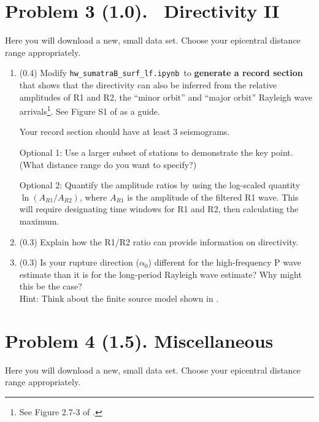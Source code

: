 \documentclass[11pt,titlepage,fleqn]{article}
\newcommand{\tfilelf}{{\tt hw\_sumatraB\_surf\_lf.ipynb}}
\begin{document}

\pagebreak
\section*{Problem 3 (1.0). \ptag\ Directivity II}

Here you will download a new, small data set.
Choose your epicentral distance range appropriately.

\begin{enumerate}
\item (0.4) Modify \tfilelf\ to \textbf{generate a record section} that shows that the directivity can also be inferred from the relative amplitudes of R1 and R2, the ``minor orbit'' and ``major orbit'' Rayleigh wave arrivals\footnote{See Figure 2.7-3 of \citet{SteinWysession}.}. See Figure S1 of \citet{Ammon2005} as a guide.

Your record section should have at least 3 seismograms.
  
Optional 1: Use a larger subset of stations to demonstrate the key point. (What distance range do you want to specify?)
  
Optional 2: Quantify the amplitude ratios by using the log-scaled quantity $\ln(A_{R1}/A_{R2})$, where $A_{R1}$ is the amplitude of the filtered R1 wave. This will require designating time windows for R1 and R2, then calculating the maximum.

\item (0.3) Explain how the R1/R2 ratio can provide information on directivity.

\item (0.3) Is your rupture direction ($\alpha_0$) different for the high-frequency P wave estimate than it is for the long-period Rayleigh wave estimate? Why might this be the case? \\
Hint: Think about the finite source model shown in .
\end{enumerate}


\section*{Problem 4 (1.5). Miscellaneous}

Here you will download a new, small data set.
Choose your epicentral distance range appropriately.
\end{document}
